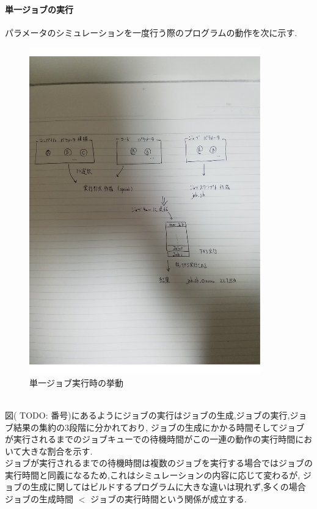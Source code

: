 \paragraph{単一ジョブの実行}
パラメータのシミュレーションを一度行う際のプログラムの動作を次に示す.\\
\begin{figure}[htb]
  \begin{center}
    \includegraphics[width=10.0cm]{./images/singlejob}
    \caption{単一ジョブ実行時の挙動}
    \label{fig:singlejob}
  \end{center}
\end{figure}
~\\
図( TODO: 番号)にあるようにジョブの実行はジョブの生成,ジョブの実行,ジョブ結果の集約の3段階に分かれており,
ジョブの生成にかかる時間そしてジョブが実行されるまでのジョブキューでの待機時間がこの一連の動作の実行時間において大きな割合を示す.\\
ジョブが実行されるまでの待機時間は複数のジョブを実行する場合ではジョブの実行時間と同義になるため,これはシミュレーションの内容に応じて変わるが,
ジョブの生成に関してはビルドするプログラムに大きな違いは現れず,多くの場合ジョブの生成時間 $<$ ジョブの実行時間という関係が成立する.\\

